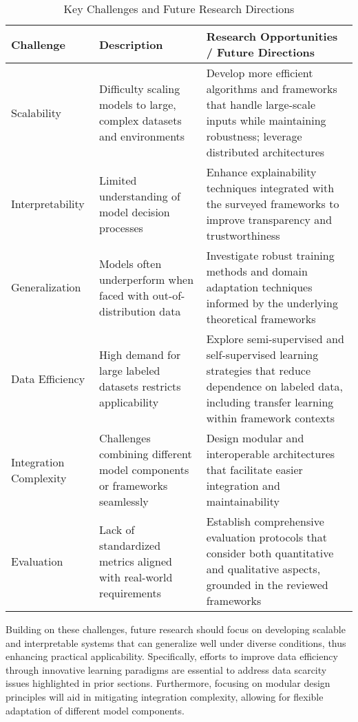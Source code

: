 \documentclass[sigconf]{acmart}
\begin{document}
\begin{table*}[htbp]
\centering
\caption{Key Challenges and Future Research Directions}
\label{tab:challenges_future}
\begin{adjustbox}{max width=\textwidth}
\begin{tabular}{@{}lll@{}}
\toprule
\textbf{Challenge} & \textbf{Description} & \textbf{Research Opportunities / Future Directions} \\ \midrule
Scalability & Difficulty scaling models to large, complex datasets and environments & Develop more efficient algorithms and frameworks that handle large-scale inputs while maintaining robustness; leverage distributed architectures \\ 
Interpretability & Limited understanding of model decision processes & Enhance explainability techniques integrated with the surveyed frameworks to improve transparency and trustworthiness \\ 
Generalization & Models often underperform when faced with out-of-distribution data & Investigate robust training methods and domain adaptation techniques informed by the underlying theoretical frameworks \\ 
Data Efficiency & High demand for large labeled datasets restricts applicability & Explore semi-supervised and self-supervised learning strategies that reduce dependence on labeled data, including transfer learning within framework contexts \\
Integration Complexity & Challenges combining different model components or frameworks seamlessly & Design modular and interoperable architectures that facilitate easier integration and maintainability \\ 
Evaluation & Lack of standardized metrics aligned with real-world requirements & Establish comprehensive evaluation protocols that consider both quantitative and qualitative aspects, grounded in the reviewed frameworks \\ \bottomrule
\end{tabular}
\end{adjustbox}
\end{table*}

Building on these challenges, future research should focus on developing scalable and interpretable systems that can generalize well under diverse conditions, thus enhancing practical applicability. Specifically, efforts to improve data efficiency through innovative learning paradigms are essential to address data scarcity issues highlighted in prior sections. Furthermore, focusing on modular design principles will aid in mitigating integration complexity, allowing for flexible adaptation of different model components.
\end{document}

